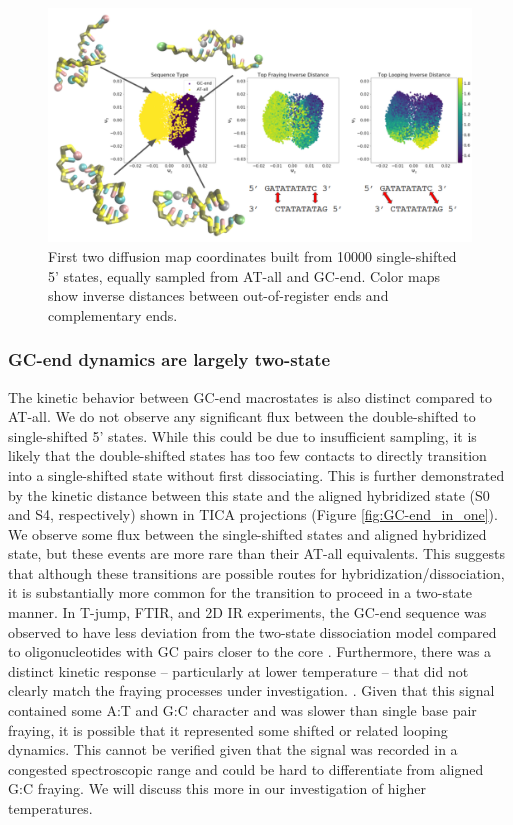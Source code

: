 \documentclass[journal=jpcbfk,manuscript=article]{achemso}
\begin{document}
\begin{figure}[ht!]
	\begin{center}
        \includegraphics[width=\textwidth]{Figs/figs_0804/GC-end_dmaps.png}
        \caption{First two diffusion map coordinates built from 10000 single-shifted 5' states, equally sampled from AT-all and GC-end. Color maps show inverse distances between out-of-register ends and complementary ends. }
        \label{fig:GC-end_dmaps}
	\end{center}
\end{figure}


\subsubsection{\label{sec:Results}GC-end dynamics are largely two-state}

The kinetic behavior between GC-end macrostates is also distinct compared to AT-all. We do not observe any significant flux between the double-shifted to single-shifted 5' states. While this could be due to insufficient sampling, it is likely that the double-shifted states has too few contacts to directly transition into a single-shifted state without first dissociating. This is further demonstrated by the kinetic distance between this state and the aligned hybridized state (S0 and S4, respectively) shown in TICA projections (Figure \ref{fig:GC-end_in_one}). We observe some flux between the single-shifted states and aligned hybridized state, but these events are more rare than their AT-all equivalents. This suggests that although these transitions are possible routes for hybridization/dissociation, it is substantially more common for the transition to proceed in a two-state manner. In T-jump, FTIR, and 2D IR experiments, the GC-end sequence was observed to have less deviation from the two-state dissociation model compared to oligonucleotides with GC pairs closer to the core \citep{Sanstead2016}. Furthermore, there was a distinct kinetic response -- particularly at lower temperature -- that did not clearly match the fraying processes under investigation. \citep{Sanstead2018DirectDehybridization}. Given that this signal contained some A:T and G:C character and was slower than single base pair fraying, it is possible that it represented some shifted or related looping dynamics. This cannot be verified given that the signal was recorded in a congested spectroscopic range and could be hard to differentiate from aligned G:C fraying. We will discuss this more in our investigation of higher temperatures.
\end{document}
